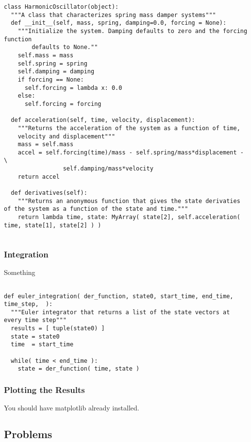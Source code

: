 \documentclass{report}
\begin{document}
\begin{verbatim}
class HarmonicOscillator(object):
  """A class that characterizes spring mass damper systems"""
  def __init__(self, mass, spring, damping=0.0, forcing = None):
    """Initialize the system. Damping defaults to zero and the forcing function 
        defaults to None.""
    self.mass = mass
    self.spring = spring
    self.damping = damping
    if forcing == None:
      self.forcing = lambda x: 0.0
    else:
      self.forcing = forcing

  def acceleration(self, time, velocity, displacement):
    """Returns the acceleration of the system as a function of time, 
    velocity and displacement"""
    mass = self.mass
    accel = self.forcing(time)/mass - self.spring/mass*displacement - \
                 self.damping/mass*velocity
    return accel

  def derivatives(self):
    """Returns an anonymous function that gives the state derivaties of the system as a function of the state and time."""
    return lambda time, state: MyArray( state[2], self.acceleration( time, state[1], state[2] ) )
      
\end{verbatim}

\subsubsection{Integration}
Something

\begin{verbatim}

def euler_integration( der_function, state0, start_time, end_time, time_step,  ):
  """Euler integrator that returns a list of the state vectors at every time step"""
  results = [ tuple(state0) ]
  state = state0
  time  = start_time

  while( time < end_time ):
    state = der_function( time, state )

\end{verbatim}

\subsubsection{Plotting the Results}

You should have matplotlib already installed.

\subsection{Problems}
\end{document}
